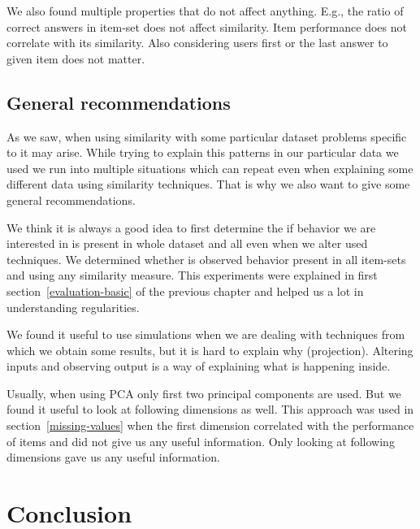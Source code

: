 \documentclass[
  printed, %
  table,   %
  nolof,     %
  nolot,     %
  color,
  final,
  nocover
]{fithesis3}
\begin{document}
We also found multiple properties that do not affect anything. E.g., the ratio of correct answers in item-set does not affect similarity. Item performance does not correlate with its similarity. Also considering users first or the last answer to given item does not matter.

\clearpage


\section{General recommendations}\label{general-recommendations}

As we saw, when using similarity with some particular dataset problems specific to it may arise. While trying to explain this patterns in our particular data we used we run into multiple situations which can repeat even when explaining some different data using similarity techniques. That is why we also want to give some general recommendations.


We think it is always a good idea to first determine the if behavior we are interested in is present in whole dataset and all even when we alter used techniques. We determined whether is observed behavior present in all item-sets and using any similarity measure. This experiments were explained in first section~\ref{evaluation-basic} of the previous chapter and helped us a lot in understanding regularities.


We found it useful to use simulations when we are dealing with techniques from which we obtain some results, but it is hard to explain why (projection). Altering inputs and observing output is a way of explaining what is happening inside.


Usually, when using PCA only first two principal components are used. But we found it useful to look at following dimensions as well. This approach was used in section~\ref{missing-values} when the first dimension correlated with the performance of items and did not give us any useful information. Only looking at following dimensions gave us any useful information.


\chapter{Conclusion}
\end{document}

